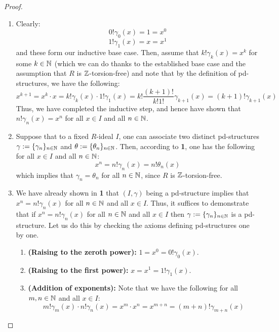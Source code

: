                     \begin{proof}
                        \noindent
                        \begin{enumerate}
                            \item Clearly:
                                $$0! \gamma_0(x) = 1 = x^0$$
                                $$1! \gamma_1(x) = x = x^1$$
                            and these form our inductive base case. Then, assume that $k! \gamma_k(x) = x^k$ for some $k \in \mathbb{N}$ (which we can do thanks to the established base case and the assumption that $R$ is $\mathbb{Z}$-torsion-free) and note that by the definition of pd-structures, we have the following:
                                $$x^{k + 1} = x^k \cdot x = k!\gamma_k(x) \cdot 1!\gamma_1(x) = k!\frac{(k + 1)!}{k! 1!} \gamma_{k + 1}(x) = (k + 1)!\gamma_{k + 1}(x)$$
                            Thus, we have completed the inductive step, and hence have shown that $n!\gamma_n(x) = x^n$ for all $x \in I$ and all $n \in \mathbb{N}$.
                            \item Suppose that to a fixed $R$-ideal $I$, one can associate two distinct pd-structures $\gamma := \{\gamma_n\}_{n \in \mathbb{N}}$ and $\theta := \{\theta_n\}_{n \in \mathbb{N}}$. Then, according to \textbf{1}, one has the following for all $x \in I$ and all $n \in \mathbb{N}$:
                                $$x^n = n!\gamma_n(x) = n!\theta_n(x)$$
                            which implies that $\gamma_n = \theta_n$ for all $n \in \mathbb{N}$, since $R$ is $\mathbb{Z}$-torsion-free.
                            \item We have already shown in \textbf{1} that $(I, \gamma)$ being a pd-structure implies that $x^n = n!\gamma_n(x)$ for all $n \in \mathbb{N}$ and all $x \in I$. Thus, it suffices to demonstrate that if $x^n = n!\gamma_n(x)$ for all $n \in \mathbb{N}$ and all $x \in I$ then $\gamma := \{\gamma_n\}_{n \in \mathbb{N}}$ is a pd-structure. Let us do this by checking the axioms defining pd-structures one by one.
                                \begin{enumerate}
                                    \item \textbf{(Raising to the zeroth power):} $1 = x^0 = 0! \gamma_0(x)$.
                                    \item \textbf{(Raising to the first power):} $x = x^1 = 1! \gamma_1(x)$.
                                    \item \textbf{(Addition of exponents):} Note that we have the following for all $m, n \in \mathbb{N}$ and all $x \in I$:
                                        $$m!\gamma_m(x) \cdot n!\gamma_n(x) = x^m \cdot x^n = x^{m + n} = (m + n)!\gamma_{m + n}(x)$$

\end{enumerate}
\end{enumerate}
\end{proof}
